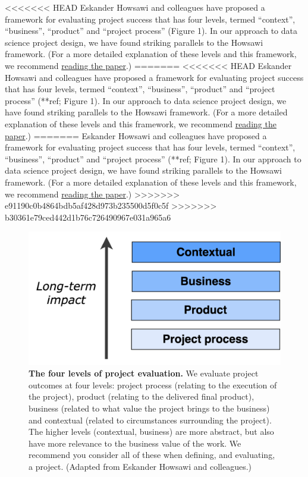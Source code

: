 \documentclass[
]{book}
\begin{document}
<<<<<<< HEAD
Eskander Howsawi and colleagues have proposed a framework for evaluating project success that has four levels, termed ``context'', ``business'', ``product'' and ``project process'' \citep{Howsawi} (Figure 1). In our approach to data science project design, we have found striking parallels to the Howsawi framework. (For a more detailed explanation of these levels and this framework, we recommend \href{https://www.researchgate.net/publication/263164826_The_four-level_project_success_framework_application_and_assessment}{reading the paper}.)
=======
<<<<<<< HEAD
Eskander Howsawi and colleagues have proposed a framework for evaluating project success that has four levels, termed ``context'', ``business'', ``product'' and ``project process'' \citep{Howsawi}(**ref; Figure 1). In our approach to data science project design, we have found striking parallels to the Howsawi framework. (For a more detailed explanation of these levels and this framework, we recommend \href{https://www.researchgate.net/publication/263164826_The_four-level_project_success_framework_application_and_assessment}{reading the paper}.)
=======
Eskander Howsawi and colleagues have proposed a framework for evaluating project success that has four levels, termed ``context'', ``business'', ``product'' and ``project process'' (**ref; Figure 1). In our approach to data science project design, we have found striking parallels to the Howsawi framework. (For a more detailed explanation of these levels and this framework, we recommend \href{https://www.researchgate.net/publication/263164826_The_four-level_project_success_framework_application_and_assessment}{reading the paper}.)
>>>>>>> e91190c0b4864bdb5af428d973b235500d5f0c5f
>>>>>>> b30361e79ced442d1b76c726490967e031a965a6



\begin{figure}
\includegraphics[width=0.7\linewidth]{figures/Figure_1-eval_levels} \caption{\textbf{The four levels of project evaluation.} We evaluate project outcomes at four levels: project process (relating to the execution of the project), product (relating to the delivered final product), business (related to what value the project brings to the business) and contextual (related to circumstances surrounding the project). The higher levels (contextual, business) are more abstract, but also have more relevance to the business value of the work. We recommend you consider all of these when defining, and evaluating, a project. (Adapted from Eskander Howsawi and colleagues.)}\label{fig:eval-levels}
\end{figure}
\end{document}
